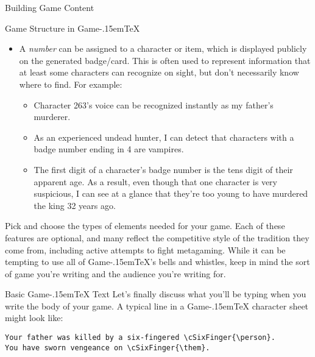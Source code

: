 \documentclass[11pt,  total={6in, 8in}]{article}
\def\gametex{\mbox{Game\kern-.15em\TeX}}
\begin{document}
\begin{section}{Building Game Content}
\begin{subsection}{Game Structure in \gametex{}}
\begin{itemize}
	\begin{itemize}
	\item Stats with obscure names, such as $\alpha$, can have secret meanings: the player might not know their $\alpha$ stat means they could be a wizard, or a vampire player might not know that their bite doesn't work on characters with a certain $\beta$ stat because they're werewolves.
	\end{itemize}
	\item A \textit{number} can be assigned to a character or item, which is displayed publicly on the generated badge/card.  This is often used to represent information that at least some characters can recognize on sight, but don't necessarily know where to find.  For example:
	\begin{itemize}
	\item Character 263's voice can be recognized instantly as my father's murderer.
	\item As an experienced undead hunter, I can detect that characters with a badge number ending in 4 are vampires.
	\item The first digit of a character's badge number is the tens digit of their apparent age.  As a result, even though that one character is very suspicious, I can see at a glance that they're too young to have murdered the king 32 years ago.
	\end{itemize}
\end{itemize}

Pick and choose the types of elements needed for your game.  Each of these features are optional, and many reflect the competitive style of the tradition they come from, including active attempts to fight metagaming.  While it can be tempting to use all of \gametex{}'s bells and whistles, keep in mind the sort of game you're writing and the audience you're writing for.
\end{subsection}
\begin{subsection}{Basic \gametex{} Text}
Let's finally discuss what you'll be typing when you write the body of your game.
A typical line in a \gametex{} character sheet might look like:
\begin{verbatim}
Your father was killed by a six-fingered \cSixFinger{\person}.  
You have sworn vengeance on \cSixFinger{\them}.
\end{verbatim}


\end{subsection}
\end{section}
\end{document}
